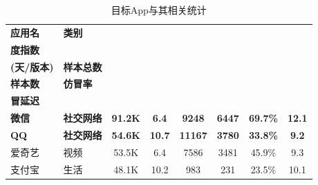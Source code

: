 \begin{ThreePartTable}
    \centering
    \renewcommand{\arraystretch}{1.05}
    \footnotesize
    \setlength{\belowcaptionskip}{-5pt}
    \vspace{1mm}
    \begin{longtable}{l l c c c c c c}
        \caption{目标App与其相关统计}\label{table:data-statistics}                                                                                                                                                        \\
        \toprule
        {\bf 应用名}                                 & {\bf 类别}     & \begin{tabular}[c]{@{}c@{}}{\bf 月度热} \\ {\bf 度指数} \end{tabular} & \begin{tabular}[c]{@{}c@{}}{\bf 更新频率} \\ {\bf (天/版本)} \end{tabular} & {\bf 样本总数} & \begin{tabular}[c]{@{}c@{}}{\bf 仿冒} \\ {\bf 样本数} \end{tabular} & {\bf 仿冒率} & \begin{tabular}[c]{@{}c@{}}{\bf 平均仿} \\ {\bf 冒延迟} \end{tabular} \\
        \midrule
        {\bf 微信}\tnote{*}                          & {\bf 社交网络} & {\bf 91.2K}                & {\bf 6.4}                  & {\bf 9248}     & {\bf 6447}                 & {\bf 69.7\%} & {\bf 12.1}                 \\
        \rowcolor{gray!15} {\bf QQ}\tnote{*}         & {\bf 社交网络} & {\bf 54.6K}                & {\bf 10.7}                 & {\bf 11167}    & {\bf 3780}                 & {\bf 33.8\%} & {\bf 9.2}                  \\
        爱奇艺                                       & 视频           & 53.5K                      & 6.4                        & 7586           & 3481                       & 45.9\%       & 9.3                        \\
        \rowcolor{gray!15} 支付宝                    & 生活           & 48.1K                      & 10.2                       & 983            & 231                        & 23.5\%       & 10.1                       \\

\end{longtable}
\end{ThreePartTable}
